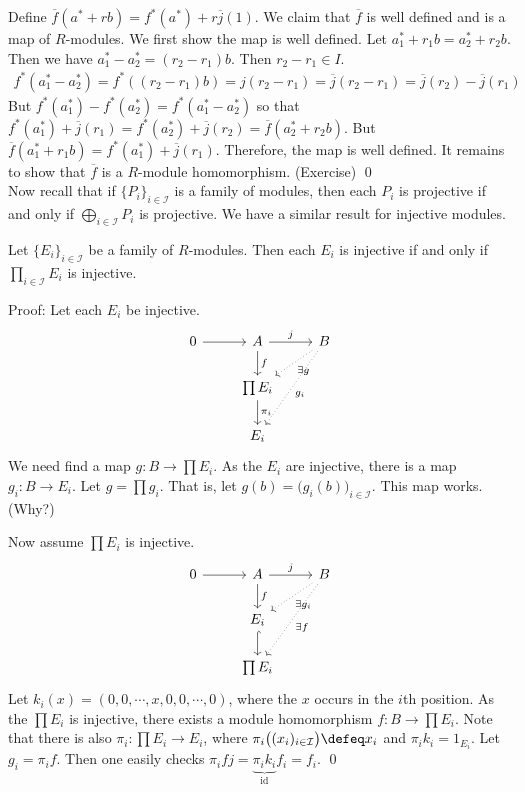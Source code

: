 Define $\overline{f}(a^*+rb)=f^*(a^*)+r\overline{j}(1)$. We claim that $\overline{f}$ is well defined and is a map of $R$-modules. We first show the map is well defined. Let $a_1^*+r_1b = a_2^*+r_2b$. Then we have $a_1^*-a_2^*=(r_2-r_1)b$. Then $r_2-r_1 \in I$.
\[
\begin{split}
f^*(a_1^*-a_2^*)=f^*((r_2-r_1)b)=j(r_2-r_1)=\overline{j}(r_2-r_1)=\overline{j}(r_2)-\overline{j}(r_1)
\end{split}
\]
But $f^*(a_1^*)-f^*(a_2^*)=f^*(a_1^*-a_2^*)$ so that $f^*(a_1^*)+\overline{j}(r_1)=f^*(a_2^*)+\overline{j}(r_2)=\overline{f}(a_2^*+r_2b)$. But $\overline{f}(a_1^*+r_1b)=f^*(a_1^*)+\overline{j}(r_1)$. Therefore, the map is well defined. It remains to show that $\overline{f}$ is a $R$-module homomorphism. (Exercise) \qed \\

Now recall that if $\{P_i\}_{i \in \mathcal{I}}$ is a family of modules, then each $P_i$ is projective if and only if $\bigoplus_{i \in \mathcal{I}} P_i$ is projective. We have a similar result for injective modules.

\begin{prop}
Let $\{E_i\}_{i \in \mathcal{I}}$ be a family of $R$-modules. Then each $E_i$ is injective if and only if $\prod_{i \in \mathcal{I}} E_i$ is injective. 
\end{prop}

Proof: Let each $E_i$ be injective. 
\[
\begin{tikzcd}
0 \arrow{r} & A \arrow{d}{f} \arrow{r}{j} & B \arrow[dotted]{dl}{\exists g} \arrow[dotted]{ddl}{g_i} \\
& \prod E_i \arrow{d}{\pi_i} & \\
& E_i &
\end{tikzcd}
\]
We need find a map $g: B \rightarrow \prod E_i$. As the $E_i$ are injective, there is a map $g_i: B \rightarrow E_i$. Let $g=\prod g_i$. That is, let $g(b)=\big(g_i(b)\big)_{i \in \mathcal{I}}$. This map works. (Why?)

Now assume $\prod E_i$ is injective. 
\[
\begin{tikzcd}
0 \arrow{r} & A \arrow{d}{f} \arrow{r}{j} & B \arrow[dotted]{dl}{\exists g_i} \arrow[dotted]{ddl}{\exists f} \\
&  E_i \arrow[hook]{d} & \\
&\prod E_i &
\end{tikzcd}
\]
Let $k_i(x)=(0,0,\cdots,x,0,0,\cdots,0)$, where the $x$ occurs in the $i$th position. As the $\prod E_i$ is injective, there exists a module homomorphism $f: B \rightarrow \prod E_i$. Note that there is also $\pi_i: \prod E_i \rightarrow E_i$, where $\pi_i\big((x_i)_{i \in \mathcal{I}} \big) \defeq x_i$ and $\pi_i k_i=1_{E_i}$. Let $g_i=\pi_i f$. Then one easily checks $\pi_i f j=\underbrace{\pi_i k_i}_{\text{id}} f_i=f_i$. \qed \\

